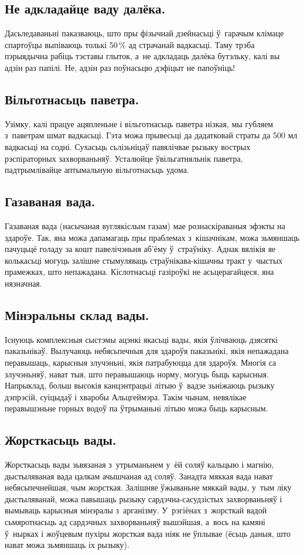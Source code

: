 \subsection{Не адкладайце ваду далёка.}
Дасьледаваньні паказваюць, што пры фізычнай дзейнасьці ў~гарачым клімаце спартоўцы выпіваюць толькі 50\,\% ад страчанай вадкасьці. Таму трэба пэрыядычна рабіць тэставы глыток, а~не адкладаць далёка бутэльку, калі вы адзін раз папілі. Не, адзін раз поўнасьцю дэфіцыт не папоўніць!

\subsection{Вільготнасьць паветра.}
Узімку, калі працуе ацяпленьне і вільготнасьць паветра нізкая, мы губляем з~паветрам шмат вадкасьці. Гэта можа прывесьці да дадатковай страты да 500 мл вадкасьці на содні. Сухасьць сьлізьніцаў павялічвае рызыку вострых рэспіраторных захворваньняў. Усталюйце ўвільгатняльнік паветра, падтрымлівайце аптымальную вільготнасьць удома.

\subsection{Газаваная вада.}
Газаваная вада (насычаная вуглякіслым газам) мае рознаскіраваныя эфэкты на здароўе. Так, яна можа дапамагаць пры праблемах з~кішачнікам, можа зьмяншаць пачуцьцё голаду за кошт павелічэньня аб'ёму ў~страўніку. Аднак вялікія яе колькасьці могуць залішне стымуляваць страўнікава-кішачны тракт у~чыстых прамежках, што непажадана. Кіслотнасьці газіроўкі не асьцерагайцеся, яна нязначная.

\subsection{Мінэральны склад вады.}
Існуюць комплексныя сыстэмы ацэнкі якасьці вады, якія ўлічваюць дзясяткі паказьнікаў. Вылучаюць небясьпечныя для здароўя паказьнікі, якія непажадана перавышаць, карысныя злучэньні, якія патрабуюцца для здароўя. Многія са злучэньняў, нават тыя, што перавышаюць норму, могуць быць карысныя. Напрыклад, больш высокія канцэнтрацыі літыю ў~вадзе зьніжаюць рызыку дэпрэсій, суіцыдаў і хваробы Альцгеймэра. Такім чынам, невялікае перавышэньне горных водоў па ўтрыманьні літыю можа быць карысным.

\subsection{Жорсткасьць вады.}
Жорсткасьць вады зьвязаная з~утрыманьнем у~ёй соляў кальцыю і магнію, дыстыляваная вада цалкам ачышчаная ад соляў. Занадта мяккая вада нават небясьпечнейшая, чым жорсткая. Залішняе ўжываньне мяккай вады, у~тым ліку дыстыляванай, можа павышаць рызыку сардэчна-сасудзістых захворваньняў і вымываць карысныя мінэралы з~арганізму. У~рэгіёнах з~жорсткай вадой сьмяротнасьць ад сардэчных захворваньняў вышэйшая, а~вось на камяні ў~нырках і жоўцевым пухіры жорсткая вада ніяк не ўплывае (ёсьць даныя, што нават можа зьмяншаць іх рызыку).

